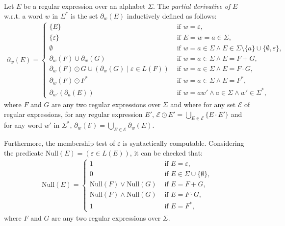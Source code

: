\documentclass[a4paper]{llncs}
\begin{document}
  \begin{definition}
    Let $E$ be a regular expression over an alphabet $\Sigma$. The \emph{partial derivative of} $E$ w.r.t. a word $w$ in $\Sigma^*$ is the set $\partial_w(E)$ inductively defined as follows:  
  \begin{align*}
      \partial_w(E)=
        \begin{cases}
            \{E\} & \text{ if } w=\varepsilon,\\
            \{\varepsilon\} & \text{ if } E=w=a\in\Sigma,\\
            \emptyset & \text{ if } w=a\in\Sigma\wedge E\in\Sigma\setminus\{a\}\cup\{\emptyset,\varepsilon\},\\
            \partial_w(F)\cup \partial_w(G) & \text{ if } w=a\in\Sigma\wedge E=F+G,\\
            \partial_w(F)\odot G \cup (\partial_w(G)\mid \varepsilon\in L(F)) & \text{ if }w=a\in\Sigma\wedge E=F\cdot G,\\
            \partial_w(F)\odot F^* & \text{ if } w=a\in\Sigma\wedge E=F^*,\\
            \partial_{w'}(\partial_a(E)) & \text{ if } w=aw'\wedge a\in\Sigma\wedge w'\in\Sigma^*,
        \end{cases}
  \end{align*}
  where $F$ and $G$ are any two regular expressions over $\Sigma$ and where for any set $\mathcal{E}$ of regular expressions, for any regular expression $E'$, $\mathcal{E}\odot E'=\bigcup_{E\in\mathcal{E}} \{E\cdot E'\}$ and for any word $w'$ in $\Sigma^*$, $\partial_w(\mathcal{E})=\bigcup_{E\in\mathcal{E}}\partial_w(E)$.
  \end{definition}
  
  Furthermore, the membership test of $\varepsilon$ is syntactically computable. Considering the predicate $\mathrm{Null}(E)=(\varepsilon\in L(E))$, it can be checked that:
  \begin{align*}
      \mathrm{Null}(E)=
        \begin{cases}
            1 & \text{ if } E=\varepsilon,\\
            0 & \text{ if } E\in\Sigma\cup\{\emptyset\},\\
            \mathrm{Null}(F)\vee \mathrm{Null}(G) & \text{ if } E=F+G,\\
            \mathrm{Null}(F)\wedge \mathrm{Null}(G) & \text{ if }E=F\cdot G,\\
            1 & \text{ if } E=F^*,
         \end{cases}   
  \end{align*}
  where $F$ and $G$ are any two regular expressions over $\Sigma$.
    
\end{document}
